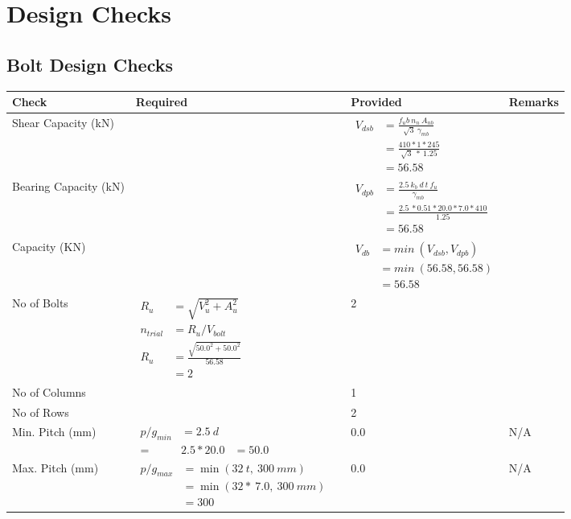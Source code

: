 \documentclass{article}%
\begin{document}
%
%
\section{Design Checks}%
\label{sec:DesignChecks}%
\subsection{Bolt Design Checks}%
\label{subsec:BoltDesignChecks}%
\renewcommand{\arraystretch}{1.2}%
\begin{longtable}{|p{4cm}|p{5cm}|p{5.5cm}|p{1.5cm}|}%
\hline%
\rowcolor{OsdagGreen}%
Check&Required&Provided&Remarks\\%
\hline%
\endhead%
\hline%
Shear Capacity (kN)&&$\begin{aligned}V_{dsb} &= \frac{f_ub ~n_n~ A_{nb}}{\sqrt{3} ~\gamma_{mb}}\\ &= \frac{410*1*245}{\sqrt{3}~*~1.25}\\ &= 56.58\end{aligned}$&\\%
\hline%
Bearing Capacity (kN)&&$\begin{aligned}V_{dpb} &= \frac{2.5~ k_b~ d~ t~ f_u}{\gamma_{mb}}\\ &= \frac{2.5~*0.51*20.0*7.0*410}{1.25}\\ &=56.58\end{aligned}$&\\%
\hline%
Capacity (KN)&&$\begin{aligned}V_{db} &= min~ (V_{dsb}, V_{dpb})\\ &= min~ (56.58,56.58)\\ &=56.58\end{aligned}$&\\%
\hline%
No of Bolts&$\begin{aligned}R_{u} &= \sqrt{V_u^2+A_u^2}\\ n_{trial} &= R_u/ V_{bolt}\\ R_{u} &= \frac{\sqrt{50.0^2+50.0^2}}{56.58}\\ &=2\end{aligned}$&2&\\%
\hline%
No of Columns&&1&\\%
\hline%
No of Rows&&2&\\%
\hline%
Min. Pitch (mm)&$\begin{aligned}p/g_{min}&= 2.5 ~ d&\\ =&2.5*20.0&=50.0\end{aligned}$&0.0&N/A\\%
\hline%
Max. Pitch (mm)&$\begin{aligned}p/g_{max} &=\min(32~t,~300~mm)&\\ &=\min(32 *~7.0,~ 300 ~mm)\\&=300\end{aligned}$&0.0&N/A\\%

\end{longtable}
\end{document}
